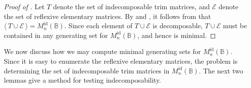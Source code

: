 \documentclass[11pt]{article}
\numberwithin{equation}{section}
\newcommand{\genset}[1]{\ensuremath{\langle\: #1 \:\rangle}}
\newcommand{\B}{\mathbb{B}}
\newcommand{\Refln}{M_n^{\text{id}}(\B)}
\begin{document}
\begin{proof}[Proof of ]
  Let $T$ denote the set of indecomposable trim matrices, and $\mathcal{E}$
  denote the set of reflexive elementary matrices. By
   and , it follows
  from  that $\genset{T \cup \mathcal{E}} =
  \Refln$. Since each element of $T \cup \mathcal{E}$ is decomposable, $T \cup
  \mathcal{E}$ must be contained in any generating set for $\Refln$, and hence is
  minimal.
\end{proof}

We now discuss how we may compute minimal generating sets for $\Refln$. Since it
is easy to enumerate the reflexive elementary matrices, the problem is
determining the set of indecomposable trim matrices in $\Refln$. The next two
lemmas give a method for testing indecomposability.
\end{document}
